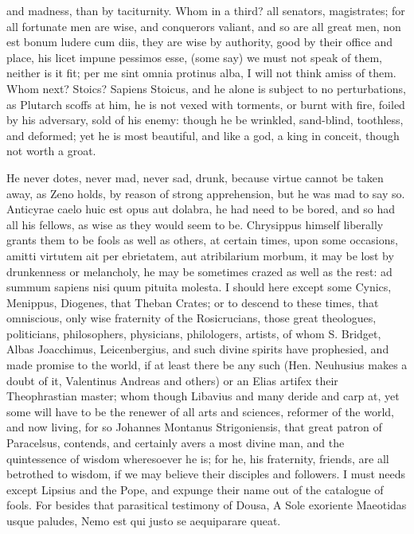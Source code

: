 {and madness, than by taciturnity. Whom in a third? all senators,
magistrates; for all fortunate men are wise, and conquerors valiant,
and so are all great men, non est bonum ludere cum diis, they are wise
by authority, good by their office and place, his licet impune pessimos
esse, (some say) we must not speak of them, neither is it fit; per me
sint omnia protinus alba, I will not think amiss of them. Whom next?
Stoics? Sapiens Stoicus, and he alone is subject to no perturbations,
as Plutarch scoffs at him, he is not vexed with torments, or burnt
with fire, foiled by his adversary, sold of his enemy: though he be
wrinkled, sand-blind, toothless, and deformed; yet he is most
beautiful, and like a god, a king in conceit, though not worth a groat.

He never dotes, never mad, never sad, drunk, because virtue cannot be
taken away, as Zeno holds, by reason of strong apprehension, but
he was mad to say so. Anticyrae caelo huic est opus aut dolabra,
he had need to be bored, and so had all his fellows, as wise as they
would seem to be. Chrysippus himself liberally grants them to be fools
as well as others, at certain times, upon some occasions, amitti
virtutem ait per ebrietatem, aut atribilarium morbum, it may be lost by
drunkenness or melancholy, he may be sometimes crazed as well as the
rest: ad summum sapiens nisi quum pituita molesta. I should here
except some Cynics, Menippus, Diogenes, that Theban Crates; or to
descend to these times, that omniscious, only wise fraternity of
the Rosicrucians, those great theologues, politicians, philosophers,
physicians, philologers, artists, \etc{} of whom S. Bridget, Albas
Joacchimus, Leicenbergius, and such divine spirits have prophesied, and
made promise to the world, if at least there be any such (Hen.
Neuhusius makes a doubt of it,  Valentinus Andreas and
others) or an Elias artifex their Theophrastian master; whom though
Libavius and many deride and carp at, yet some will have to be the
renewer of all arts and sciences, reformer of the world, and now
living, for so Johannes Montanus Strigoniensis, that great patron of
Paracelsus, contends, and certainly avers a most divine man, and
the quintessence of wisdom wheresoever he is; for he, his fraternity,
friends, \etc{} are all betrothed to wisdom, if we may believe their
disciples and followers. I must needs except Lipsius and the Pope, and
expunge their name out of the catalogue of fools. For besides that
parasitical testimony of Dousa,
A Sole exoriente Maeotidas usque paludes,
Nemo est qui justo se aequiparare queat.

}
